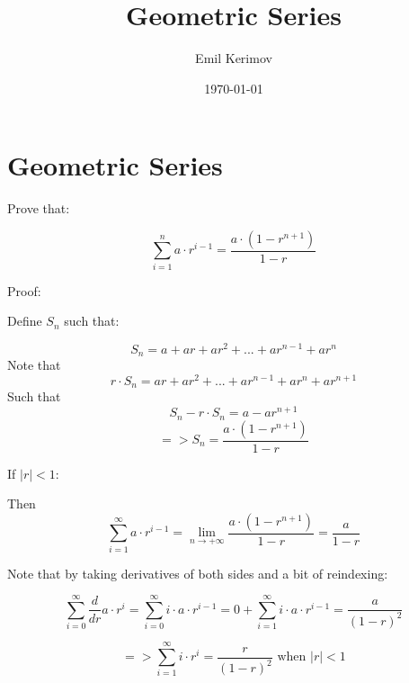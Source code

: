 ﻿\documentclass[a4paper]{article}
\title{Geometric Series}
\author{Emil Kerimov}
\date{\today}
\begin{document}
\maketitle
\section{Geometric Series}\label{gs:Geometric Series}

Prove that:

$$\sum\limits_{i=1}^{n} a\cdot r^{i-1} =  \frac{a\cdot(1-r^{n+1})}{1-r}$$

Proof:

Define $S_n$ such that:

$$S_{n} = a + ar + ar^2 + ... + ar^{n-1}+ar^n$$
Note that $$r\cdot S_{n} = ar + ar^2 + ... + ar^{n-1} + ar^n + ar^{n+1}$$
Such that $$S_{n}-r\cdot S_{n} = a-ar^{n+1}$$
$$=>
S_{n} = \frac{a\cdot(1-r^{n+1})}{1-r}
$$


If $|r|<1$:

Then 
$$\sum\limits_{i=1}^{\infty} a\cdot r^{i-1}
= \lim_{n \to +\infty}\frac{a\cdot(1-r^{n+1})}{1-r}
= \frac{a}{1-r}
$$

Note that by taking derivatives of both sides and a bit of reindexing:

$$\sum\limits_{i=0}^{\infty} \frac{d}{dr}a\cdot r^{i}
=\sum\limits_{i=0}^{\infty} i\cdot a\cdot r^{i-1}
=0+\sum\limits_{i=1}^{\infty} i\cdot a\cdot r^{i-1}
= \frac{a}{(1-r)^2}
$$

$$=>
\sum\limits_{i=1}^{\infty} i\cdot r^{i}
= \frac{r}{(1-r)^2} \mbox{ when } |r|<1
$$
\end{document}
